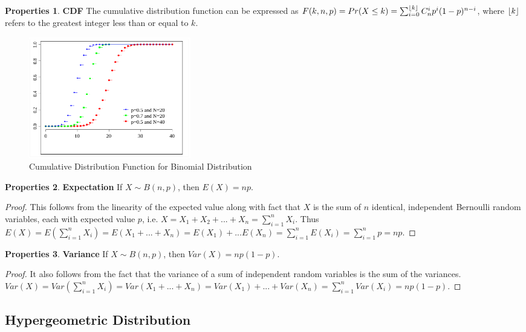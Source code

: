 \documentclass{article}
\theoremstyle{definition}
\newtheorem{prop}{Properties}[section]
\DeclarePairedDelimiter\floor{\lfloor}{\rfloor}
\begin{document}
\begin{prop}
\textbf{CDF} The cumulative distribution function can be expressed as $F(k,n,p)=Pr(X\leq k)=\sum_{i=0}^{\floor*{k}}C_{n}^{i}p^i(1-p)^{n-i}$, where $\floor*{k}$ refers to the greatest integer less than or equal to $k$.
\begin{figure}[h]
\caption{Cumulative Distribution Function for Binomial Distribution}
\centering
\includegraphics[width=200pt]{Statistics/images/Binomial_distribution_cdf.pdf}
\end{figure}

\end{prop}
\begin{prop}
\textbf{Expectation} If $X\sim B(n,p)$, then $E(X)=np$.
\begin{proof}
This follows from the linearity of the expected value along with fact that $X$ is the sum of $n$ identical, independent Bernoulli random variables, each with expected value $p$, i.e. $X=X_1+X_2+...+X_n=\sum_{i=1}^{n}X_i$. Thus $E(X)=E(\sum_{i=1}^{n}X_i)=E(X_1+...+X_n)=E(X_1)+...E(X_n)=\sum_{i=1}^{n}E(X_i)=\sum_{i=1}^{n}p=np$.
\end{proof}
\end{prop}

\begin{prop}
\textbf{Variance} If $X\sim B(n,p)$, then $Var(X)=np(1-p)$.
\begin{proof}
It also follows from the fact that the variance of a sum of independent random variables is the sum of the variances.
$Var(X)=Var(\sum_{i=1}^{n}X_i)=Var(X_1+...+X_n)=Var(X_1)+...+Var(X_n)=\sum_{i=1}^{n}Var(X_i)=np(1-p)$.
\end{proof}
\end{prop}

\subsection{Hypergeometric Distribution}
\end{document}
